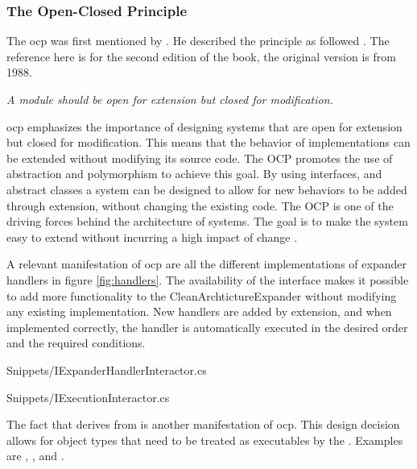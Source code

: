 \subsubsection*{The Open-Closed Principle} \label{subsubsec:ocp}

The \gls{ocp} was first mentioned by . He described
the principle as followed \parencite[79]{meyer_object-oriented_1997}. The reference here
is for the second edition of the book, the original version is from 1988.

\begin{tcolorbox}[boxrule=0.1pt, colback=mygray, title=\acrlong{ocp} ,colbacktitle=gray]
    \textit{A module should	be open for extension but closed for modification.}
\end{tcolorbox}

\gls{ocp} emphasizes the importance of designing systems that are open for extension but
closed for modification. This means that the behavior of implementations can be extended
without modifying its source code. The OCP promotes the use of abstraction and
polymorphism to achieve this goal. By using interfaces, and abstract classes a system can
be designed to allow for new behaviors to be added through extension, without changing the
existing code. The OCP is one of the driving forces	behind the architecture	of systems.
The goal is	to make	the	system easy	to extend without incurring a high impact of change
\parencite[94]{robert_c_martin_clean_2018}.

A relevant manifestation of \gls{ocp} are all the different implementations of expander
handlers in figure \ref{fig:handlers}. The availability of the
 interface makes it possible to add more
functionality to the CleanArchtictureExpander without modifying any existing
implementation. New handlers are added by extension, and when implemented correctly, the
handler is automatically executed in the desired order and the required conditions.


    {Snippets/IExpanderHandlerInteractor.cs}


    {Snippets/IExecutionInteractor.cs}

The fact that  derives from
 is another manifestation of \gls{ocp}. This
design decision allows for object types that need to be treated as executables by the
. Examples are
,
,
 and
. 

